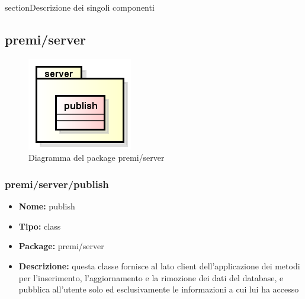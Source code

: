 section{Descrizione dei singoli componenti}

\subsection{premi/server}
\begin{figure}[h]
\begin{center}
\includegraphics[scale=0.45]{img/diapkg/server.png}
\caption{Diagramma del package premi/server}
\end{center}
\end{figure}

\subsubsection{premi/server/publish}
\begin{itemize}
  \item[] \textbf{Nome:} publish
  \item[] \textbf{Tipo:} class
  \item[] \textbf{Package:} premi/server
  \item[] \textbf{Descrizione:} questa classe fornisce al lato client dell'applicazione dei metodi per l'inserimento, l'aggiornamento e la rimozione dei dati del database, e pubblica all'utente solo ed esclusivamente le informazioni a cui lui ha accesso
\end{itemize}







